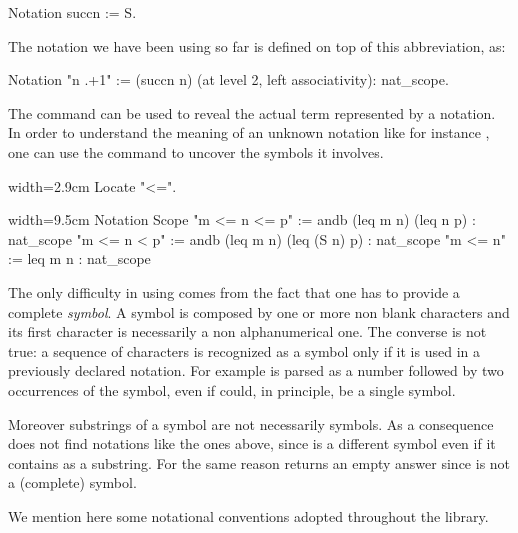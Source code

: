 \begin{coq}{}{}
Notation succn := S.
\end{coq}

The notation  we have been using so far is defined on top of
this abbreviation, as:

\begin{coq}{}{}
Notation "n .+1" := (succn n) (at level 2, left associativity): nat_scope.
\end{coq}

The  command can be used to reveal the actual term
represented by a notation.  In order to understand the meaning of an unknown notation like for instance , one can use the  command to uncover the symbols it involves.

\begin{coq}{}{width=2.9cm}
Locate "<=".
$~$
$~$
$~$
\end{coq}
\begin{coqout}{}{width=9.5cm}
Notation                                       Scope
"m <= n <= p" := andb (leq m n) (leq n p)    : nat_scope
"m <= n < p" := andb (leq m n) (leq (S n) p) : nat_scope
"m <= n" := leq m n                          : nat_scope
\end{coqout}

The only difficulty in using  comes from the fact
that one has to provide a complete \emph{symbol}.  A symbol
is composed by one or more non blank characters and its first
character is necessarily a non alphanumerical one.
The converse is not true: a sequence of characters is recognized as
a symbol only if it is used in a previously declared notation.
For example  is parsed as a number followed by two
occurrences of the  symbol, even if  could, in
principle, be a single symbol.

Moreover substrings of a symbol are not necessarily symbols.  As a consequence
 does not find notations like the ones above, since \C{<=} is a
different symbol even if it contains \C{=} as a substring.  For the same reason
 returns an empty answer since  is not a (complete)
symbol.

We mention here some notational conventions
adopted throughout the \mcbMC{} library.


